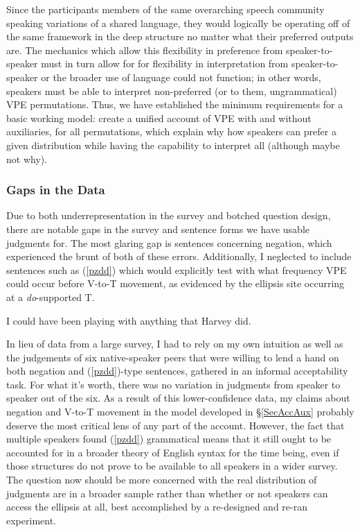 \documentclass[11pt, oneside]{article}
\begin{document}
Since the participants members of the same overarching speech community speaking variations of a shared language, they would logically be operating off of the same framework in the deep structure no matter what their preferred outputs are. The mechanics which allow this flexibility in preference from speaker-to-speaker must in turn allow for for flexibility in interpretation from speaker-to-speaker or the broader use of language could not function; in other words, speakers must be able to interpret non-preferred (or to them, ungrammatical) VPE permutations. Thus, we have established the minimum requirements for a basic working model: create a unified account of VPE with and without auxiliaries, for all permutations, which explain why how speakers can prefer a given distribution while having the capability to interpret all (although maybe not why).

\subsubsection{Gaps in the Data}

Due to both underrepresentation in the survey and botched question design, there are notable gaps in the survey and sentence forms we have usable judgments for. The most glaring gap is sentences concerning negation, which experienced the brunt of both of these errors. Additionally, I neglected to include sentences such as (\ref{pzdd}) which would explicitly test with what frequency VPE could occur before V-to-T movement, as evidenced by the ellipsis site occurring at a \textit{do}-supported T.

\begin{exe}
\ex\label{pzdd} I could have been playing with anything that Harvey did.
\end{exe}

In lieu of data from a large survey, I had to rely on my own intuition as well as the judgements of six native-speaker peers that were willing to lend a hand on both negation and (\ref{pzdd})-type sentences, gathered in an informal acceptability task. For what it's worth, there was no variation in judgments from speaker to speaker out of the six. As a result of this lower-confidence data, my claims about negation and V-to-T movement in the model developed in \S\ref{SecAccAux} probably deserve the most critical lens of any part of the account. However, the fact that multiple speakers found (\ref{pzdd}) grammatical means that it still ought to be accounted for in a broader theory of English syntax for the time being, even if those structures do not prove to be available to all speakers in a wider survey. The question now should be more concerned with the real distribution of judgments are in a broader sample rather than whether or not speakers can access the ellipsis at all, best accomplished by a re-designed and re-ran experiment.
\end{document}
